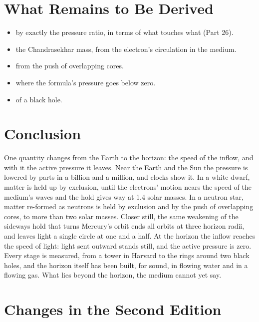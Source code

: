 \documentclass[11pt,a4paper]{article}
\begin{document}
\section{What Remains to Be Derived}

\begin{itemize}
\item {} by exactly the pressure ratio, in terms of what touches what (Part 26).
\item {} the Chandrasekhar mass, from the electron's circulation in the medium.
\item {} from the push of overlapping cores.
\item {} where the formula's pressure goes below zero.
\item {} of a black hole.
\end{itemize}

\section*{Conclusion}

One quantity changes from the Earth to the horizon: the speed of the inflow, and with it the active pressure it leaves. Near the Earth and the Sun the pressure is lowered by parts in a billion and a million, and clocks show it. In a white dwarf, matter is held up by exclusion, until the electrons' motion nears the speed of the medium's waves and the hold gives way at 1.4 solar masses. In a neutron star, matter re-formed as neutrons is held by exclusion and by the push of overlapping cores, to more than two solar masses. Closer still, the same weakening of the sideways hold that turns Mercury's orbit ends all orbits at three horizon radii, and leaves light a single circle at one and a half. At the horizon the inflow reaches the speed of light: light sent outward stands still, and the active pressure is zero. Every stage is measured, from a tower in Harvard to the rings around two black holes, and the horizon itself has been built, for sound, in flowing water and in a flowing gas. What lies beyond the horizon, the medium cannot yet say.

\clearpage
\section*{Changes in the Second Edition}
\end{document}
